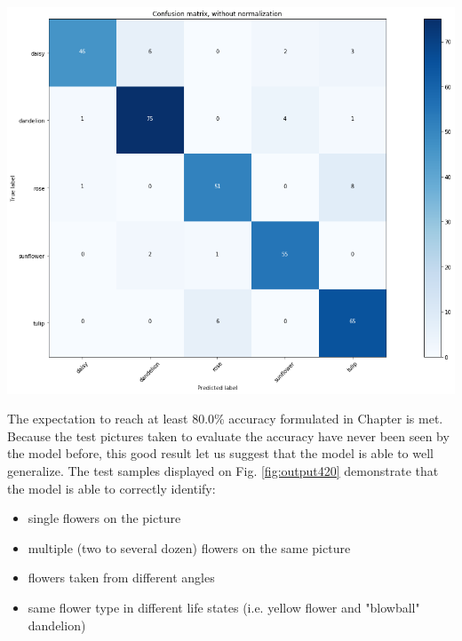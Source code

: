 \begin{center}
	\includegraphics[scale=.4]{sections/04_results/output_40_2}
	\label{fig:output402}
\end{center}

The expectation to reach at least 80.0\% accuracy formulated in Chapter  is met. Because the test pictures taken to evaluate the accuracy have never been seen by the model before, this good result let us suggest that the model is able to well generalize. The test samples displayed on Fig. \ref{fig:output420} demonstrate that the model is able to correctly identify:

\begin{itemize}
	\item single flowers on the picture
	\item multiple (two to several dozen) flowers on the same picture
	\item flowers taken from different angles
	\item same flower type in different life states (i.e. yellow flower and "blowball" dandelion)
\end{itemize}





